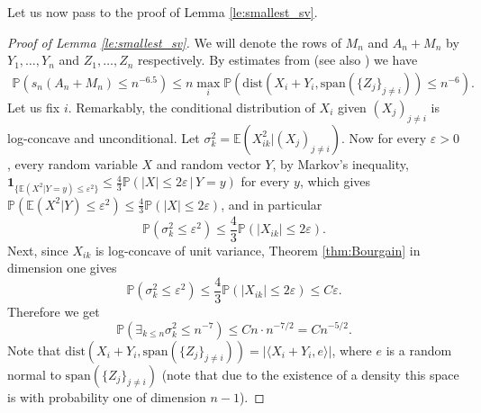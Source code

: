 \documentclass[12pt,reqno]{amsart}
\begin{document}
Let us now pass to the proof of Lemma \ref{le:smallest_sv}.

\begin{proof}[Proof of Lemma \ref{le:smallest_sv}]
  We will denote the rows of $M_n$ and $A_n+M_n$ by $Y_1,\ldots,Y_n$ and
  $Z_1,\ldots,Z_n$ respectively. By estimates from \cite{RV} (see also
  \cite[Lemma B.2]{BCC2}) we have 
  \begin{align}\label{eq:RV_bound}
    {\mathbb{P}}(s_n(A_n+M_n) \le n^{-6.5}) \le n\max_i{\mathbb{P}}({\mathrm{dist}}(X_i+Y_i,{\mathrm{span}}(\{Z_j\}_{j\neq i}))\le n^{-6}).
  \end{align}
  Let us fix $i$. Remarkably, the conditional distribution of $X_{i}$ given
  $(X_j)_{j\neq i}$ is log-concave and unconditional. Let $\sigma_k^2 =
  {\mathbb{E}}(X_{ik}^2|(X_{j})_{j\neq i})$. Now for every $\varepsilon>0$, every random
  variable $X$ and random vector $Y$, by Markov's inequality,
  $\mathbf{1}_{\{\mathbb{E}(X^2|Y=y)\leq\varepsilon^2\}}\leq\frac{4}{3}\mathbb{P}(|X|\leq
  2\varepsilon\,|\,Y=y)$ for every $y$, which gives
  $\mathbb{P}(\mathbb{E}(X^2|Y)\leq\varepsilon^2)\leq\frac{4}{3}\mathbb{P}(|X|\leq2\varepsilon)$,
  and in particular
  \[
  {\mathbb{P}}(\sigma_k^2 \le \varepsilon^2)   \le \frac{4}{3}{\mathbb{P}}(|X_{ik}|\le 2\varepsilon).
  \]
  Next, since $X_{ik}$ is log-concave of unit variance, Theorem
  \ref{thm:Bourgain} in dimension one gives
  \[
  {\mathbb{P}}(\sigma_k^2 \le \varepsilon^2)   \le \frac{4}{3}{\mathbb{P}}(|X_{ik}|\le 2\varepsilon)   \le C\varepsilon.
  \]
  Therefore we get
  \[
  {\mathbb{P}}(\exists_{k\le n} \sigma_k^2 \le n^{-7}) \le Cn\cdot n^{-7/2} = Cn^{-5/2}.
  \]
  Note that ${\mathrm{dist}}(X_i+Y_i,{\mathrm{span}}(\{Z_j\}_{j\neq i})) = |\langle
  X_i+Y_i,e\rangle|$, where $e$ is a random normal to ${\mathrm{span}}(\{Z_j\}_{j\neq
    i})$ (note that due to the existence of a density this space is with
  probability one of dimension $n-1$). 
  

\end{proof}
\end{document}
